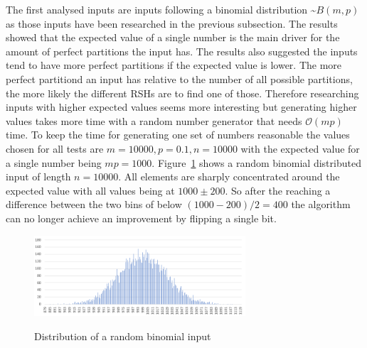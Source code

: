 The first analysed inputs are inputs following a binomial distribution \textasciitilde$B(m,p)$ as those inputs have been researched in the previous subsection. The results showed that the expected value of a single number is the main driver for the amount of perfect partitions the input has. The results also suggested the inputs tend to have more perfect partitions if the expected value is lower. The more perfect partitiond an input has relative to the number of all possible partitions, the more likely the different RSHs are to find one of those. Therefore researching inputs with higher expected values seems more interesting but generating higher values takes more time with a random number generator that needs $\mathcal{O}(mp)$ time. To keep the time for generating one set of numbers reasonable the values chosen for all tests are $m=10000, p=0.1, n=10000$ with the expected value for a single number being $mp=1000$. Figure~\ref{fig:binDistExample} shows a random binomial distributed input of length $n=10000$. All elements are sharply concentrated around the expected value with all values being at $1000\pm200$. So after the reaching a difference between the two bins of below $(1000-200)/2=400$ the algorithm can no longer achieve an improvement by flipping a single bit.

\begin{figure}[h]
      \caption{Distribution of a random binomial input}
      \centering
      \includegraphics[width=0.7\textwidth]{figures/images/numberGenerator/binomialDistributionForN10000p0_1.png}\label{fig:binDistExample}
\end{figure}